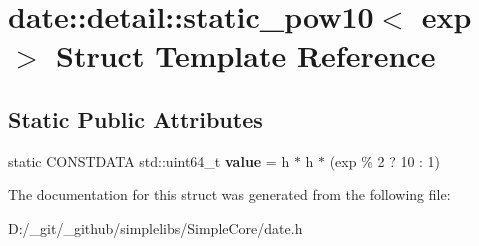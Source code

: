\hypertarget{structdate_1_1detail_1_1static__pow10}{}\section{date\+::detail\+::static\+\_\+pow10$<$ exp $>$ Struct Template Reference}
\label{structdate_1_1detail_1_1static__pow10}
\subsection*{Static Public Attributes}
\begin{DoxyCompactItemize}
\item 
\mbox{\label{structdate_1_1detail_1_1static__pow10_a2b7e2731ebc466cf8751163fbd70fb19}} 
static C\+O\+N\+S\+T\+D\+A\+TA std\+::uint64\+\_\+t {\bfseries value} = h $\ast$ h $\ast$ (exp \% 2 ? 10 \+: 1)
\end{DoxyCompactItemize}


The documentation for this struct was generated from the following file\+:\begin{DoxyCompactItemize}
\item 
D\+:/\+\_\+git/\+\_\+github/simplelibs/\+Simple\+Core/date.\+h\end{DoxyCompactItemize}
